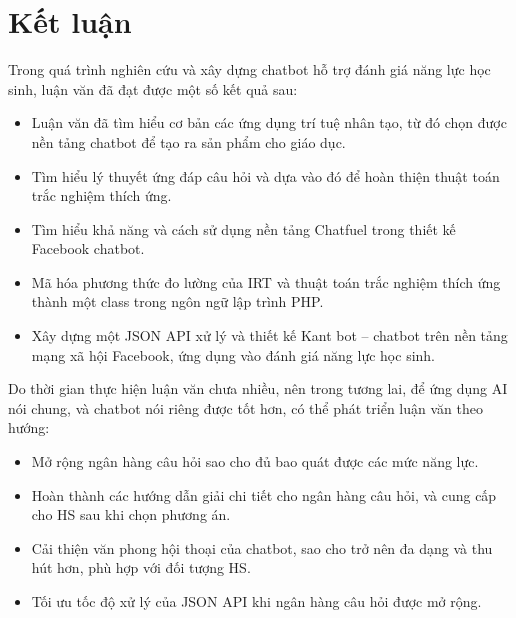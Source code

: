 \chapter*{Kết luận}

Trong quá trình nghiên cứu và xây dựng chatbot hỗ trợ đánh giá năng lực học sinh, luận văn đã đạt được một số kết quả sau: \begin{itemize}
	\item Luận văn đã tìm hiểu cơ bản các ứng dụng trí tuệ nhân tạo, từ đó chọn được nền tảng chatbot để tạo ra sản phẩm cho giáo dục.
	\item Tìm hiểu lý thuyết ứng đáp câu hỏi và dựa vào đó để hoàn thiện thuật toán trắc nghiệm thích ứng.
	\item Tìm hiểu khả năng và cách sử dụng nền tảng Chatfuel trong thiết kế Facebook chatbot.
	\item Mã hóa phương thức đo lường của IRT và thuật toán trắc nghiệm thích ứng thành một class trong ngôn ngữ lập trình PHP.
	\item Xây dựng một JSON API xử lý và thiết kế Kant bot – chatbot trên nền tảng mạng xã hội Facebook, ứng dụng vào đánh giá năng lực học sinh.
\end{itemize}

Do thời gian thực hiện luận văn chưa nhiều, nên trong tương lai, để ứng dụng AI nói chung, và chatbot nói riêng được tốt hơn, có thể phát triển luận văn theo hướng: \begin{itemize}
	\item Mở rộng ngân hàng câu hỏi sao cho đủ bao quát được các mức năng lực.
	\item Hoàn thành các hướng dẫn giải chi tiết cho ngân hàng câu hỏi, và cung cấp cho HS sau khi chọn phương án.
	\item Cải thiện văn phong hội thoại của chatbot, sao cho trở nên đa dạng và thu hút hơn, phù hợp với đối tượng HS.
	\item Tối ưu tốc độ xử lý của JSON API khi ngân hàng câu hỏi được mở rộng.
\end{itemize}
